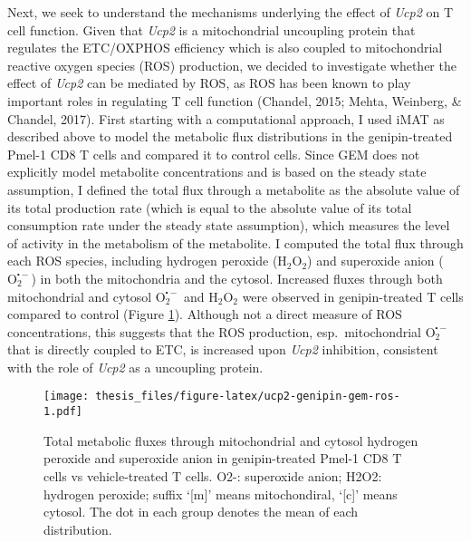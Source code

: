 \documentclass[12pt,twoside,openany,\mydriver]{thesis}  %
\begin{document}
Next, we seek to understand the mechanisms underlying the effect of \emph{Ucp2} on T cell function. Given that \emph{Ucp2} is a mitochondrial uncoupling protein that regulates the ETC/OXPHOS efficiency which is also coupled to mitochondrial reactive oxygen species (ROS) production, we decided to investigate whether the effect of \emph{Ucp2} can be mediated by ROS, as ROS has been known to play important roles in regulating T cell function (Chandel, 2015; Mehta, Weinberg, \& Chandel, 2017). First starting with a computational approach, I used iMAT as described above to model the metabolic flux distributions in the genipin-treated Pmel-1 CD8 T cells and compared it to control cells. Since GEM does not explicitly model metabolite concentrations and is based on the steady state assumption, I defined the total flux through a metabolite as the absolute value of its total production rate (which is equal to the absolute value of its total consumption rate under the steady state assumption), which measures the level of activity in the metabolism of the metabolite. I computed the total flux through each ROS species, including hydrogen peroxide (\(\mathrm{H_2O_2}\)) and superoxide anion (\(\mathrm{O_2^{\centerdot -}}\)) in both the mitochondria and the cytosol. Increased fluxes through both mitochondrial and cytosol \(\mathrm{O_2^{\centerdot -}}\) and \(\mathrm{H_2O_2}\) were observed in genipin-treated T cells compared to control (Figure \ref{fig:ucp2-genipin-gem-ros}). Although not a direct measure of ROS concentrations, this suggests that the ROS production, esp.~mitochondrial \(\mathrm{O_2^{\centerdot -}}\) that is directly coupled to ETC, is increased upon \emph{Ucp2} inhibition, consistent with the role of \emph{Ucp2} as a uncoupling protein.
\begin{figure}
\centering
\texttt{[image: thesis\_files/figure-latex/ucp2-genipin-gem-ros-1.pdf]}
\caption{\label{fig:ucp2-genipin-gem-ros}Total metabolic fluxes through mitochondrial and cytosol hydrogen peroxide and superoxide anion in genipin-treated Pmel-1 CD8 T cells vs vehicle-treated T cells. O2-: superoxide anion; H2O2: hydrogen peroxide; suffix `{[}m{]}' means mitochondiral, `{[}c{]}' means cytosol. The dot in each group denotes the mean of each distribution.}
\end{figure}
\end{document}
